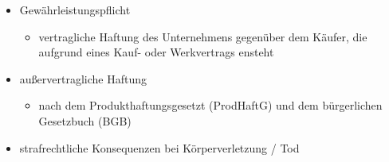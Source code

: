 \documentclass[12pt]{article}
\begin{document}
\begin{note}

    \begin{field}
        \begin{itemize}
            \item Gewährleistungspflicht
                \begin{itemize}
                    \item vertragliche Haftung des Unternehmens gegenüber dem Käufer, die aufgrund eines Kauf- oder Werkvertrags ensteht
                \end{itemize}
            \item außervertragliche Haftung
                \begin{itemize}
                    \item nach dem Produkthaftungsgesetzt (ProdHaftG) und dem bürgerlichen Gesetzbuch (BGB)
                \end{itemize}
            \item strafrechtliche Konsequenzen bei Körperverletzung / Tod
        \end{itemize}
    \end{field}
\end{note}
\end{document}

